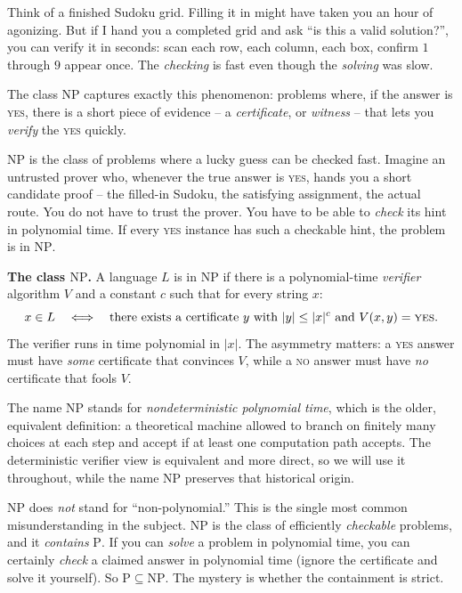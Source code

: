 Think of a finished Sudoku grid. Filling it in might have taken you an hour of
agonizing. But if I hand you a completed grid and ask ``is this a valid
solution?'', you can verify it in seconds: scan each row, each column, each box,
confirm $1$ through $9$ appear once. The \emph{checking} is fast even though the
\emph{solving} was slow.

The class $\mathrm{NP}$ captures exactly this phenomenon: problems where, if the
answer is \textsc{yes}, there is a short piece of evidence -- a
\emph{certificate}, or \emph{witness} -- that lets you \emph{verify} the
\textsc{yes} quickly.

\begin{intuitionbox}
$\mathrm{NP}$ is the class of problems where a lucky guess can be checked fast.
Imagine an untrusted prover who, whenever the true answer is \textsc{yes}, hands
you a short candidate proof -- the filled-in Sudoku, the satisfying assignment,
the actual route. You do not have to trust the prover. You have to be able
to \emph{check} its hint in polynomial time. If every \textsc{yes} instance has
such a checkable hint, the problem is in $\mathrm{NP}$.
\end{intuitionbox}

\begin{formalbox}
\textbf{The class $\mathrm{NP}$.} A language $L$ is in $\mathrm{NP}$ if there is a
polynomial-time \emph{verifier} algorithm $V$ and a constant $c$ such that for
every string $x$:
\[
  x \in L \quad\Longleftrightarrow\quad
  \text{there exists a certificate } y \text{ with } |y| \le |x|^c
  \text{ and } V(x,y)=\textsc{yes}.
\]
The verifier runs in time polynomial in $|x|$. The asymmetry matters: a
\textsc{yes} answer must have \emph{some} certificate that convinces $V$, while a
\textsc{no} answer must have \emph{no} certificate that fools $V$.
\end{formalbox}

The name $\mathrm{NP}$ stands for \emph{nondeterministic polynomial time}, which
is the older, equivalent definition: a theoretical machine allowed to branch on
finitely many choices at each step and accept if at least one computation path
accepts. The deterministic verifier view is equivalent and more direct, so we
will use it throughout, while the name $\mathrm{NP}$ preserves that historical
origin.

\begin{trapbox}
$\mathrm{NP}$ does \emph{not} stand for ``non-polynomial.'' This is the single
most common misunderstanding in the subject. $\mathrm{NP}$ is the class of
efficiently \emph{checkable} problems, and it \emph{contains} $\mathrm{P}$.
If you can \emph{solve} a problem in polynomial time, you can certainly
\emph{check} a claimed answer in polynomial time (ignore the certificate and
solve it yourself). So $\mathrm{P} \subseteq \mathrm{NP}$. The mystery is whether
the containment is strict.
\end{trapbox}

